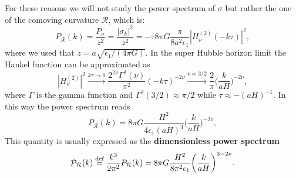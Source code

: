 For these reasons we will not study the power spectrum of $\sigma$ but rather the one of the comoving curvature $\mathcal{R}$, which is:
$${P_\mathcal{R}}(k)=\frac{{P}_\sigma}{z^2} =\frac{|\sigma_k|^2}{z^2}=-\tau8\pi G\frac{\pi}{8a^2\epsilon_1}|H_\nu^{(2)}(-k\tau)|^2,$$where we used that $z=a\sqrt{\epsilon_1/(4\pi G)}$. In the super Hubble horizon limit the Hankel function can be approximated as 
$$|H_\nu^{(2)}|^2\xrightarrow{k\tau\to0}\frac{2^{2\nu}\Gamma^2(\nu)}{\pi^2}(-k\tau)^{-2\nu}\xrightarrow{\nu\approx3/2}\frac{2}{\pi}\bigg(\frac{k}{aH}\bigg)^{-2\nu},$$ where $\Gamma$ is the gamma function and $\Gamma^2(3/2)\approx\pi/2$ while $\tau\approx-(aH)^{-1}$. In this way the power spectrum reads
\begin{equation}
    {P_\mathcal{R}}(k)=8\pi G\frac{H^2}{4\epsilon_1(aH)^3}\bigg(\frac{k}{aH}\bigg)^{-2\nu},\label{eq:Scalar_Power_spectrum}
\end{equation}
This quantity is usually expressed as the \textbf{dimensionless power spectrum}
\begin{equation}
    \mathcal{P}_\mathcal{R}(k)\stackrel{\text{def}}{=} \frac{k^3}{2\pi^2}P_\mathcal{R}(k)=8\pi G\frac{H^2}{8\pi^2\epsilon_1}\bigg(\frac{k}{aH}\bigg)^{3-2\nu}.\label{eq:Scalar_Dimensionless_Power_spectrum}
\end{equation}

